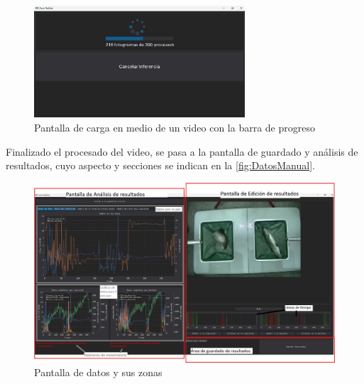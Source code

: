 \begin{figure}[H]
    \centering
    \includegraphics[width=0.7\textwidth]{images/9/CargaManual.png}
    \caption{Pantalla de carga en medio de un video con la barra de progreso}
    \label{fig:CargaParaManual}
\end{figure}

Finalizado el procesado del video, se pasa a la pantalla de guardado y análisis de resultados, cuyo aspecto y secciones se indican en la \autoref{fig:DatosManual}.

\begin{figure}[H]
    \centering
    \includegraphics[width=\textwidth]{images/9/PantallaDatos.png}
    \caption{Pantalla de datos y sus zonas}
    \label{fig:DatosManual}
\end{figure}


